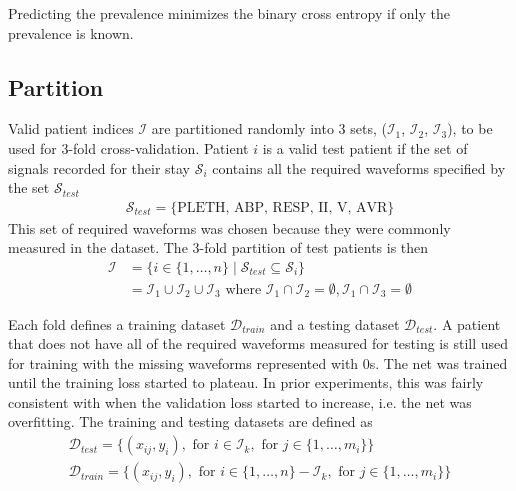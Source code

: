 Predicting the prevalence minimizes the binary cross entropy if only the prevalence is known.

\subsection{Partition}

Valid patient indices $\mathcal{I}$ are partitioned randomly into 3 sets, ($\mathcal{I}_1$, $\mathcal{I}_2$, $\mathcal{I}_3$), to be used for 3-fold cross-validation.  Patient $i$ is a valid test patient if the set of signals recorded for their stay $\mathcal{S}_i$ contains all the required waveforms specified by the set $\mathcal{S}_{test}$
\begin{gather}
    \mathcal{S}_{test} = \{ \text{PLETH, ABP, RESP, II, V, AVR} \}
\end{gather}
This set of required waveforms was chosen because they were commonly measured in the dataset.  The 3-fold partition of test patients is then
\begin{align}
    \mathcal{I} 
        &= \{
            i \in \{1, \dots, n\} \mid 
            \mathcal{S}_{test} \subseteq \mathcal{S}_i
        \} \\
        &= \mathcal{I}_1 \cup \mathcal{I}_2 \cup \mathcal{I}_3 \text{ where }
            \mathcal{I}_1 \cap \mathcal{I}_2 = \emptyset, \mathcal{I}_1 \cap \mathcal{I}_3 = \emptyset
\end{align}

Each fold defines a training dataset $\mathcal{D}_{train}$ and a testing dataset $\mathcal{D}_{test}$.  A patient that does not have all of the required waveforms measured for testing is still used for training with the missing waveforms represented with 0s.  The net was trained until the training loss started to plateau.  In prior experiments, this was fairly consistent with when the validation loss started to increase, i.e. the net was overfitting. The training and testing datasets are defined as
\begin{gather}
    \mathcal{D}_{test} = \{
        (x_{ij}, y_i),
        \text{ for } i \in \mathcal{I}_k,
        \text{ for } j \in \{ 1, \dots, m_i \}
    \} \\
    \mathcal{D}_{train} = \{
        (x_{ij}, y_i),
        \text{ for } i \in \{1, \dots, n\} - \mathcal{I}_k,
        \text{ for } j \in \{ 1, \dots, m_i \}
    \}
\end{gather}


